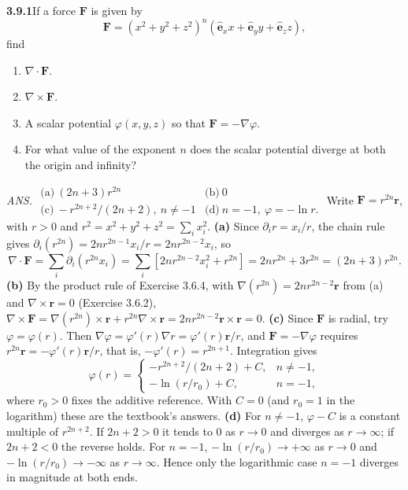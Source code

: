\par\bigskip
\noindent\textbf{3.9.1}\quad If a force $\mathbf{F}$ is given by
\[
\mathbf{F}=\left(x^{2}+y^{2}+z^{2}\right)^{n}
\left(\hat{\mathbf{e}}_{x}x+\hat{\mathbf{e}}_{y}y+\hat{\mathbf{e}}_{z}z\right),
\]
find
\begin{enumerate}
\item[(a)] $\nabla\cdot\mathbf{F}$.
\item[(b)] $\nabla\times\mathbf{F}$.
\item[(c)] A scalar potential $\varphi(x,y,z)$ so that $\mathbf{F}
  =-\nabla\varphi$.
\item[(d)] For what value of the exponent $n$ does the scalar potential
  diverge at both the origin and infinity?
\end{enumerate}
\par\nobreak\hfill\emph{ANS.}\enspace
$\begin{array}{ll}
\text{(a)}\ (2n+3)r^{2n}&\text{(b)}\ 0\\
\text{(c)}\ -r^{2n+2}/(2n+2),\ n\neq-1&\text{(d)}\ n=-1,\ \varphi=-\ln r.
\end{array}$
\solution
Write $\mathbf F=r^{2n}\mathbf r$, with $r>0$ and
$r^2=x^2+y^2+z^2=\sum_ix_i^2$.
\textbf{(a)} Since $\partial_i r=x_i/r$, the chain rule gives
$\partial_i(r^{2n})=2nr^{2n-1}x_i/r=2nr^{2n-2}x_i$, so
\[
\nabla\cdot\mathbf F
=\sum_i\partial_i(r^{2n}x_i)
=\sum_i[2n r^{2n-2}x_i^2+r^{2n}]
=2nr^{2n}+3r^{2n}=\boxed{(2n+3)r^{2n}}.
\]
\textbf{(b)} By the product rule of Exercise 3.6.4, with
$\nabla(r^{2n})=2nr^{2n-2}\mathbf r$ from (a) and
$\nabla\times\mathbf r=0$ (Exercise 3.6.2),
$\nabla\times\mathbf F=\nabla(r^{2n})\times\mathbf r
+r^{2n}\nabla\times\mathbf r
=2nr^{2n-2}\mathbf r\times\mathbf r=\boxed0$.
\textbf{(c)} Since $\mathbf F$ is radial, try $\varphi=\varphi(r)$.
Then $\nabla\varphi=\varphi'(r)\nabla r=\varphi'(r)\mathbf r/r$, and
$\mathbf F=-\nabla\varphi$ requires
$r^{2n}\mathbf r=-\varphi'(r)\mathbf r/r$, that is,
$-\varphi'(r)=r^{2n+1}$. Integration gives
\[
\boxed{\varphi(r)=
\begin{cases}
-r^{2n+2}/(2n+2)+C,&n\ne-1,\\
-\ln(r/r_0)+C,&n=-1,
\end{cases}}
\]
where $r_0>0$ fixes the additive reference. With $C=0$ (and $r_0=1$
in the logarithm) these are the textbook's answers.
\textbf{(d)} For $n\ne-1$, $\varphi-C$ is a constant multiple of
$r^{2n+2}$. If $2n+2>0$ it tends to $0$ as $r\to0$ and diverges as
$r\to\infty$; if $2n+2<0$ the reverse holds. For $n=-1$,
$-\ln(r/r_0)\to+\infty$ as $r\to0$ and $-\ln(r/r_0)\to-\infty$ as
$r\to\infty$. Hence only the logarithmic case $\boxed{n=-1}$ diverges
in magnitude at both ends.

